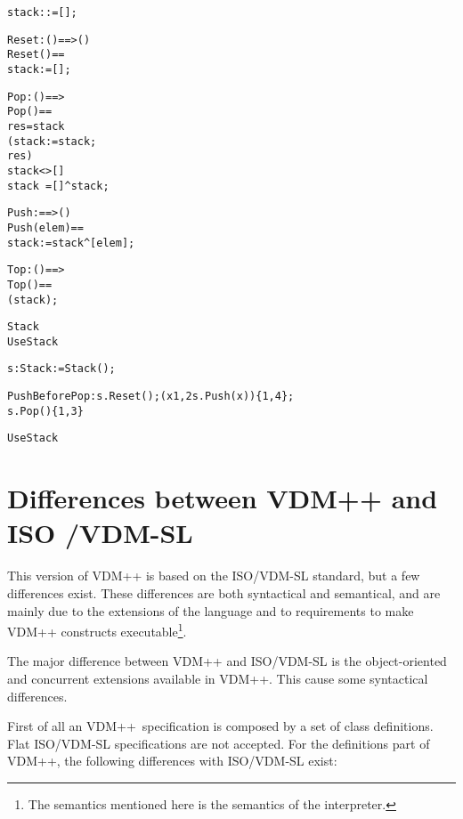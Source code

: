 \documentclass[\pformat,12pt]{article}
\newcommand{\vdmslpp}[2]{%
#2
}
\newcommand{\vdmsl}{VDM-SL}
\newcommand{\vdmpp}{VDM++}
\begin{document}
\begin{description}
\begin{alltt}
    stack :  := [];


     Reset : () ==> ()
    Reset () ==
      stack := [];

     Pop : () ==> 
    Pop() ==
       res =  stack 
        (stack :=  stack;
          res)
     stack <> []
     stack~ = [] ^ stack;

     Push:  ==> ()
    Push(elem) ==
      stack := stack ^ [elem];

     Top : () ==> 
    Top() ==
       ( stack);

 Stack
 UseStack


  s : Stack :=  Stack();


  PushBeforePop : s.Reset(); ( x  {1,2}  s.Push(x))\{1,4\}; 
                  s.Pop()\{1,3\}
 
 UseStack
\end{alltt}
\end{description}

\section{Differences between  VDM++
         and ISO /VDM-SL}\label{diff}

This version of  \vdmslpp{\vdmsl}{\vdmpp} is based on 
the ISO/VDM-SL standard, but a few differences exist. These
differences are both syntactical and semantical, and are mainly due to
the extensions of the language and to requirements to make 
\vdmslpp{\vdmsl}{\vdmpp} constructs executable\footnote{The semantics
mentioned here is the semantics of the interpreter.}.


The major difference between  {\vdmpp} and ISO/VDM-SL is the
object-oriented and concurrent %
extensions available in 
\vdmpp. This cause some syntactical differences.

First of all an  \vdmpp\ specification is composed by a set of
class definitions. Flat ISO/VDM-SL specifications are not
accepted. For the definitions part of  \vdmpp, the following differences
with ISO/VDM-SL exist:
\end{document}
